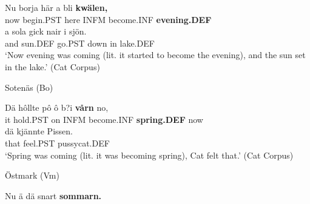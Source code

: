 
 \ea\label{}
\gll Nu  borja  här  a  bli  \textbf{kwälen,} \\


now  begin.PST  here  INFM  become.INF  \textbf{evening.DEF} \\

 \ea\label{}
\gll a  sola  gick  nair  i  sjön.\\


and  sun.DEF  go.PST  down  in  lake.DEF\\

\glt ‘Now evening was coming (lit. it started to become the evening), and the sun set in the lake.’ (Cat Corpus)

\z

\item 

Sotenäs (Bo)



 \ea\label{}
\gll Dä  hôllte  pô  ô  b?i  \textbf{vårn} no,\\


it  hold.PST  on  INFM  become.INF  \textbf{spring.DEF} now\\

 \ea\label{}
\gll dä  kjännte  Pissen.\\


that  feel.PST  pussycat.DEF\\

\glt ‘Spring was coming (lit. it was becoming spring), Cat felt that.’ (Cat Corpus)

\z

\item 

Östmark (Vm)



 \ea\label{}
\gll Nu  ä  dä  snart  \textbf{sommarn.}\\


